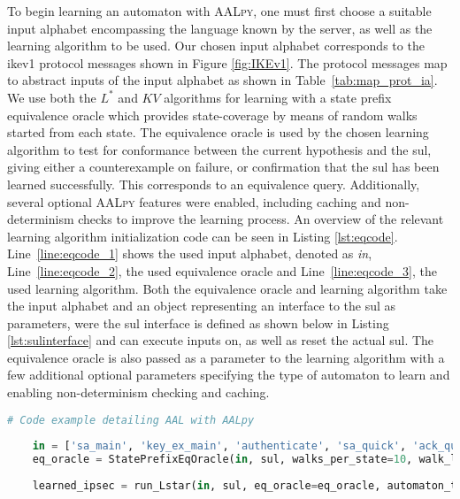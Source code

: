 To begin learning an automaton with \textsc{AALpy}, one must first choose a suitable input alphabet encompassing the language known by the server, as well as the learning algorithm to be used. Our chosen input alphabet corresponds to the \ac{ike}v1 protocol messages shown in Figure \ref{fig:IKEv1}. The protocol messages map to abstract inputs of the input alphabet as shown in Table~\ref{tab:map_prot_ia}. We use both the $L^*$ and $KV$ algorithms for learning with a state prefix equivalence oracle which provides state-coverage by means of random walks started from each state. The equivalence oracle is used by the chosen learning algorithm to test for conformance between the current hypothesis and the \ac{sul}, giving either a counterexample on failure, or confirmation that the \ac{sul} has been learned successfully. This corresponds to an equivalence query. Additionally, several optional \textsc{AALpy} features were enabled, including caching and non-determinism checks to improve the learning process. An overview of the relevant learning algorithm initialization code can be seen in Listing \ref{lst:eqcode}. Line~\ref{line:eqcode_1} shows the used input alphabet, denoted as \emph{in}, Line~\ref{line:eqcode_2}, the used equivalence oracle and Line~\ref{line:eqcode_3}, the used learning algorithm. Both the equivalence oracle and learning algorithm take the input alphabet and an object representing an interface to the \ac{sul} as parameters, were the \ac{sul} interface is defined as shown below in Listing \ref{lst:sulinterface} and can execute inputs on, as well as reset the actual \ac{sul}. The equivalence oracle is also passed as a parameter to the learning algorithm with a few additional optional parameters specifying the type of automaton to learn and enabling non-determinism checking and caching. \\

\begin{lstlisting}[float=h, caption=Model-learning framework initialisation code excerpt., label=lst:eqcode, language=python, escapechar=§]
	# Code example detailing AAL with AALpy
	
	in = ['sa_main', 'key_ex_main', 'authenticate', 'sa_quick', 'ack_quick'] §\label{line:eqcode_1}§
	eq_oracle = StatePrefixEqOracle(in, sul, walks_per_state=10, walk_len=10) §\label{line:eqcode_2}§
	
	learned_ipsec = run_Lstar(in, sul, eq_oracle=eq_oracle, automaton_type='mealy', cache_and_non_det_check=True) §\label{line:eqcode_3}§
	
\end{lstlisting}

